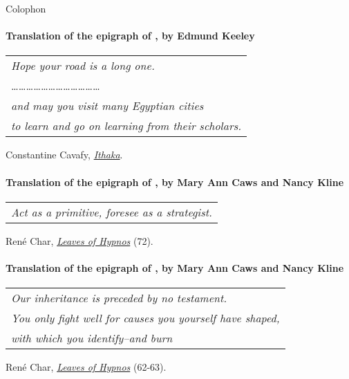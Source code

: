 \thispagestyle{empty}
\pagestyle{plain}
\begin{center}
	{\Huge Colophon}
\end{center}

\paragraph{Translation of the epigraph of , by Edmund Keeley}

\begin{flushright}
	\begin{tabular}{@{}l@{}}
		\emph{Hope your road is a long one.}\\
		\dots\dots\dots\dots\dots\dots\dots\dots\dots\dots\dots\dots\\
		\emph{and may you visit many Egyptian cities}\\
		\emph{to learn and go on learning from their scholars.}\\
	\end{tabular}
	
	Constantine Cavafy, \href{https://www.poetryfoundation.org/poems/51296/ithaka-56d22eef917ec}{\emph{Ithaka}}.
\end{flushright}

\paragraph{Translation of the epigraph of , by Mary Ann Caws and Nancy Kline}
\begin{flushright}
	\begin{tabular}{@{}l@{}}
		\emph{Act as a primitive, foresee as a strategist.}\\
	\end{tabular}
	
	René Char, \href{https://brooklynrail.org/2007/12/poetry/leaves-of-hypnos}{\emph{Leaves of Hypnos}} {\small (72)}.
\end{flushright}

\paragraph{Translation of the epigraph of , by Mary Ann Caws and Nancy Kline}

\begin{flushright}
	\begin{tabular}{@{}l@{}}
		\emph{Our inheritance is preceded by no testament.}\\
		\emph{You only fight well for causes you yourself have shaped,}\\
		\emph{with which you identify--and burn}\\
	\end{tabular}
	
	René Char, \href{https://brooklynrail.org/2007/12/poetry/leaves-of-hypnos}{\emph{Leaves of Hypnos}} {\small (62-63)}.
\end{flushright}

